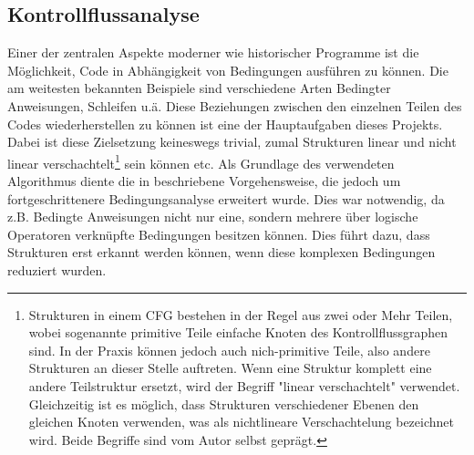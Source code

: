 \documentclass[11pt]{article} %
\begin{document}
\subsection{Kontrollflussanalyse} \label{sec:CFA} Einer der zentralen Aspekte moderner wie
historischer Programme ist die Möglichkeit, Code in Abhängigkeit von Bedingungen ausführen zu
können. Die am weitesten bekannten Beispiele sind verschiedene Arten Bedingter Anweisungen, Schleifen
u.ä. Diese Beziehungen zwischen den einzelnen Teilen des Codes wiederherstellen zu können ist eine der
Hauptaufgaben dieses Projekts. Dabei ist diese Zielsetzung keineswegs trivial, zumal Strukturen
linear und nicht linear verschachtelt\footnote{Strukturen in einem CFG bestehen in der Regel aus
zwei oder Mehr Teilen, wobei sogenannte primitive Teile einfache Knoten des Kontrollflussgraphen
sind. In der Praxis können jedoch auch nich-primitive Teile, also andere Strukturen an dieser Stelle
auftreten. Wenn eine Struktur komplett eine andere Teilstruktur ersetzt, wird der Begriff "linear
verschachtelt" verwendet. Gleichzeitig ist es möglich, dass Strukturen verschiedener Ebenen den
gleichen Knoten verwenden, was als nichtlineare Verschachtelung bezeichnet wird. Beide Begriffe sind
vom Autor selbst geprägt.} sein können etc. Als Grundlage des verwendeten Algorithmus diente die in
\cite{structural_analysis:1} beschriebene Vorgehensweise, die jedoch um fortgeschrittenere
Bedingungsanalyse erweitert wurde. Dies war notwendig, da z.B. Bedingte Anweisungen nicht nur eine,
sondern mehrere über logische Operatoren verknüpfte Bedingungen besitzen können. Dies führt dazu,
dass Strukturen erst erkannt werden können, wenn diese komplexen Bedingungen reduziert wurden.
\end{document}
